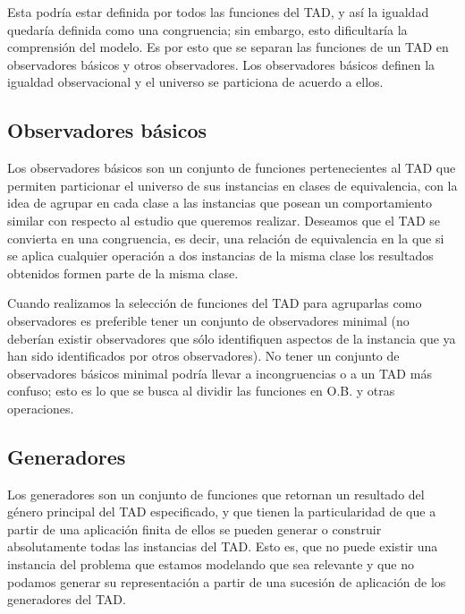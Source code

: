 Esta podr\'ia estar definida por todos las funciones del TAD, y as\'i la igualdad quedar\'ia definida como una congruencia; sin embargo, esto dificultar\'ia la comprensi\'on del modelo. Es por esto que se separan las funciones de un TAD en observadores b\'asicos y otros observadores. Los observadores b\'asicos definen la igualdad observacional y el universo se particiona de acuerdo a ellos.

\subsection{Observadores b\'asicos}
Los observadores b\'asicos son un conjunto de funciones pertenecientes al TAD que permiten particionar el universo de sus instancias en clases de equivalencia, con la idea de agrupar en cada clase a las instancias que posean un comportamiento similar con respecto al estudio que queremos realizar. Deseamos que el TAD se convierta en una congruencia, es decir, una relaci\'on de equivalencia en la que si se aplica cualquier operaci\'on a dos instancias de la misma clase los resultados obtenidos formen parte de la misma clase.

Cuando realizamos la selecci\'on de funciones del TAD para agruparlas como observadores es preferible tener un conjunto de observadores minimal (no deber\'ian existir observadores que s\'olo identifiquen aspectos de la instancia que ya han sido identificados por otros observadores). No tener un conjunto de observadores b\'asicos minimal podr\'ia llevar a incongruencias o a un TAD m\'as confuso; esto es lo que se busca al dividir las funciones en O.B. y otras operaciones.

\subsection{Generadores}
Los generadores son un conjunto de funciones que retornan un resultado del g\'enero principal del TAD especificado, y que tienen la particularidad de que a partir de una aplicaci\'on finita de ellos se pueden generar o construir absolutamente todas las instancias del TAD. Esto es, que no puede existir una instancia del problema que estamos modelando que sea relevante y que no podamos generar su representaci\'on a partir de una sucesi\'on de aplicaci\'on de los generadores del TAD.

